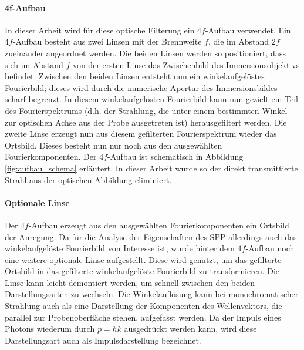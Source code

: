 \documentclass[titlepage,  ngerman]{article}
\begin{document}
	\paragraph{4f-Aufbau}
	In dieser Arbeit wird für diese optische Filterung ein $4f$-Aufbau verwendet. Ein $4f$-Aufbau besteht aus zwei Linsen mit der Brennweite $f$, die im Abstand $2f$ zueinander angeordnet werden. Die beiden Linsen werden so positioniert, dass sich im Abstand $f$ von der ersten Linse das Zwischenbild des Immersionsobjektivs befindet. Zwischen den beiden Linsen entsteht nun ein winkelaufgelöstes Fourierbild; dieses wird durch die numerische Apertur des Immersionsbildes scharf begrenzt.  In diesem winkelaufgelösten Fourierbild kann nun gezielt ein Teil des Fourierspektrums (d.h. der Strahlung, die unter einem bestimmten Winkel zur optischen Achse aus der Probe ausgetreten ist) herausgefiltert werden. Die zweite Linse erzeugt nun aus diesem gefilterten Fourierspektrum wieder das Ortsbild. Dieses besteht nun nur noch aus den ausgewählten Fourierkomponenten. Der $4f$-Aufbau ist schematisch in Abbildung \ref{fig:aufbau_schema} erläutert. In dieser Arbeit wurde so der direkt transmittierte Strahl aus der optischen Abbildung eliminiert.
	\paragraph{Optionale Linse}
	Der $4f$-Aufbau erzeugt aus den ausgewählten Fourierkomponenten ein Ortsbild der Anregung. Da für die Analyse der Eigenschaften des SPP allerdings auch das winkelaufgelöste Fourierbild von Interesse ist, wurde hinter dem $4f$-Aufbau noch eine weitere optionale Linse aufgestellt. Diese wird genutzt, um das gefilterte Ortsbild in das gefilterte winkelaufgelöste Fourierbild zu transformieren. Die Linse kann leicht demontiert werden, um schnell zwischen den beiden Darstellungsarten zu wechseln. Die Winkelauflösung kann bei monochromatischer Strahlung auch als eine Darstellung der Komponenten des Wellenvektors, die parallel zur Probenoberfläche stehen, aufgefasst werden. Da der Impuls eines Photons wiederum durch $p = \hbar k$ ausgedrückt werden kann, wird diese Darstellungsart auch als Impulsdarstellung bezeichnet.
	
\end{document}
